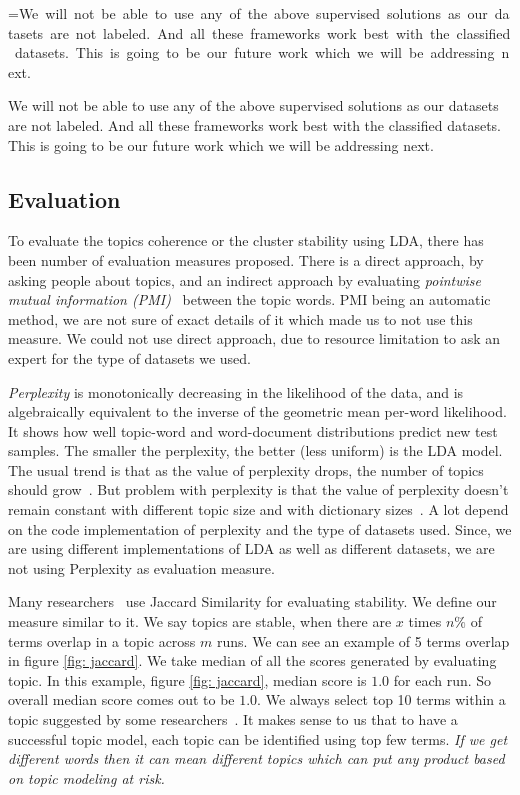 \documentclass[conference]{IEEEtran}
\makeatletter
\newcommand{\mybox}[1]{%
  \setbox0=\hbox{#1}%
  \setlength{\@tempdima}{\dimexpr\linewidth}%
  \begin{tcolorbox}[colframe=mycolor,boxrule=0.5pt,arc=4pt,
      left=6pt,right=6pt,top=6pt,bottom=6pt,boxsep=0pt,width=\@tempdima]
    #1
  \end{tcolorbox}
}
\theoremstyle{break}
\makeatother
\begin{document}
\mybox{We will not be able to use any of the above supervised solutions as our datasets are not labeled. And all these frameworks work best with the classified datasets. This is going to be our future work which we will be addressing next.}

\subsection{Evaluation}
\label{sect: evaluation}
To evaluate the topics coherence or the cluster stability using LDA, there has been number of evaluation measures proposed. There is a direct approach, by asking people about topics, and an indirect approach by evaluating \textit{pointwise mutual information (PMI)}~\cite{lau2014machine, o2015analysis} between the topic words. PMI being an automatic method, we are not sure of exact details of it which made us to not use this measure. We could not use direct approach, due to resource limitation to ask an expert for the type of datasets we used.

\textit{Perplexity} is monotonically decreasing in the likelihood of the data, and is algebraically equivalent to the inverse of the geometric mean per-word likelihood. It shows how well topic-word and word-document distributions predict new test samples. The smaller the perplexity, the better (less uniform) is the LDA model. The usual trend is that as the value of perplexity drops, the number of topics should grow~\cite{koltcov2014latent}. But problem with perplexity is that the value of perplexity doesn't remain constant with different topic size and with dictionary sizes~\cite{koltcov2014latent, zhao2015heuristic}. A lot depend on the code implementation of perplexity and the type of datasets used. Since, we are using different implementations of LDA as well as different datasets, we are not using Perplexity as evaluation measure.

Many researchers~\cite{o2015analysis, galvis2013analysis} use Jaccard Similarity for evaluating stability. We define our measure similar to it. We say topics are stable, when there are $x$ times $n\%$ of terms overlap in a topic across $m$ runs. We can see an example of 5 terms overlap in figure \ref{fig: jaccard}. We take median of all the scores generated by evaluating topic. In this example, figure \ref{fig: jaccard}, median score is $1.0$ for each run. So overall median score comes out to be $1.0$. We always select top 10 terms within a topic suggested by some researchers~\cite{panichella2013effectively, lukins2010bug}. It makes sense to us that to have a successful topic model, each topic can be identified using top few terms. \textit{If we get different words then it can mean different topics which can put any product based on topic modeling at risk.}
\end{document}
